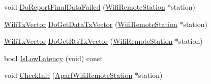 \begin{DoxyCompactItemize}
\item 
void \hyperlink{classns3_1_1AparfWifiManager_a3e6ef24072ef4b6020c2b31593e9dfc1}{Do\+Report\+Final\+Data\+Failed} (\hyperlink{structns3_1_1WifiRemoteStation}{Wifi\+Remote\+Station} $\ast$station)
\item 
\hyperlink{classns3_1_1WifiTxVector}{Wifi\+Tx\+Vector} \hyperlink{classns3_1_1AparfWifiManager_a9be0935377c6c6052cc12407d17dafbd}{Do\+Get\+Data\+Tx\+Vector} (\hyperlink{structns3_1_1WifiRemoteStation}{Wifi\+Remote\+Station} $\ast$station)
\item 
\hyperlink{classns3_1_1WifiTxVector}{Wifi\+Tx\+Vector} \hyperlink{classns3_1_1AparfWifiManager_a091b6da1ff7d3d0ae61ca96dc4ee256b}{Do\+Get\+Rts\+Tx\+Vector} (\hyperlink{structns3_1_1WifiRemoteStation}{Wifi\+Remote\+Station} $\ast$station)
\item 
bool \hyperlink{classns3_1_1AparfWifiManager_aafb3635568f0624f4f8048be71613d93}{Is\+Low\+Latency} (void) const 
\item 
void \hyperlink{classns3_1_1AparfWifiManager_a98a3fc4dfff3bcc1bc452dfed963576f}{Check\+Init} (\hyperlink{structns3_1_1AparfWifiRemoteStation}{Aparf\+Wifi\+Remote\+Station} $\ast$station)
\end{DoxyCompactItemize}
